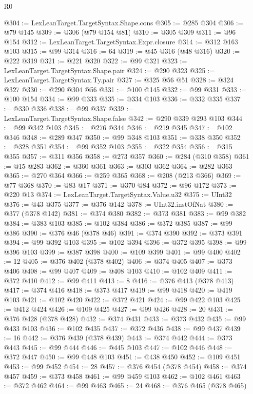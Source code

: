\begin{lexlean}{R0}
\begin{coremodule}
@304 := LexLeanTarget.TargetSyntax.Shape.cons
@305 := @285 @304
@306 := @79 @145
@309 := @306 (@79 @154 @81)
@310 := @305 @309
@311 := @96 @154
@312 := LexLeanTarget.TargetSyntax.Expr.closure
@314 := @312 @163 @103
@315 := @99 @314
@316 := 64
@319 := @45 @316 (@48 @316)
@320 := @222 @319
@321 := @221 @320
@322 := @99 @321
@323 := LexLeanTarget.TargetSyntax.Shape.pair
@324 := @290 @323
@325 := LexLeanTarget.TargetSyntax.Ty.pair
@327 := @325 @56 @51
@328 := @324 @327
@330 := @290 @304 @56
@331 := @100 @145
@332 := @99 @331
@333 := @100 @154
@334 := @99 @333
@335 := @334 @103
@336 := @332 @335
@337 := @330 @336
@338 := @99 @337
@339 := LexLeanTarget.TargetSyntax.Shape.false
@342 := @290 @339 @293 @103
@344 := @99 @342 @103
@345 := @276 @344
@346 := @219 @345
@347 := @102 @346
@348 := @289 @347
@350 := @99 @348 @103
@351 := @338 @350
@352 := @328 @351
@354 := @99 @352 @103
@355 := @322 @354
@356 := @315 @355
@357 := @311 @356
@358 := @273 @357
@360 := @284 (@310 @358)
@361 := @15 @283
@362 := @360 @361
@363 := @303 @362
@364 := @282 @363
@365 := @270 @364
@366 := @259 @365
@368 := @208 (@213 @366)
@369 := @77 @368
@370 := @83 @17
@371 := @370 @84
@372 := @96 @172
@373 := @220 @13
@374 := LexLeanTarget.TargetSyntax.Value.u32
@375 := UInt32
@376 := @43 @375
@377 := @376 @142
@378 := UInt32.instOfNat
@380 := @377 (@378 @142)
@381 := @374 @380
@382 := @373 @381
@383 := @99 @382
@384 := @383 @103
@385 := @102 @384
@386 := @372 @385
@387 := @99 @386
@390 := @376 @46 (@378 @46)
@391 := @374 @390
@392 := @373 @391
@394 := @99 @392 @103
@395 := @102 @394
@396 := @372 @395
@398 := @99 @396 @103
@399 := @387 @398
@400 := @109 @399
@401 := @99 @400
@402 := 12
@405 := @376 @402 (@378 @402)
@406 := @374 @405
@407 := @373 @406
@408 := @99 @407
@409 := @408 @103
@410 := @102 @409
@411 := @372 @410
@412 := @99 @411
@413 := 8
@416 := @376 @413 (@378 @413)
@417 := @374 @416
@418 := @373 @417
@419 := @99 @418
@420 := @419 @103
@421 := @102 @420
@422 := @372 @421
@424 := @99 @422 @103
@425 := @412 @424
@426 := @109 @425
@427 := @99 @426
@428 := 20
@431 := @376 @428 (@378 @428)
@432 := @374 @431
@433 := @373 @432
@435 := @99 @433 @103
@436 := @102 @435
@437 := @372 @436
@438 := @99 @437
@439 := 16
@442 := @376 @439 (@378 @439)
@443 := @374 @442
@444 := @373 @443
@445 := @99 @444
@446 := @445 @103
@447 := @102 @446
@448 := @372 @447
@450 := @99 @448 @103
@451 := @438 @450
@452 := @109 @451
@453 := @99 @452
@454 := 28
@457 := @376 @454 (@378 @454)
@458 := @374 @457
@459 := @373 @458
@461 := @99 @459 @103
@462 := @102 @461
@463 := @372 @462
@464 := @99 @463
@465 := 24
@468 := @376 @465 (@378 @465)

\end{coremodule}
\end{lexlean}
